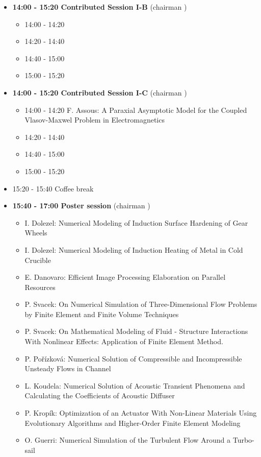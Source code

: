 \documentclass[10pt, A4]{article}%
\begin{document}
\begin{itemize}
\begin{itemize}
  \end{itemize}
  \item {\bf 14:00 - 15:20 Contributed Session I-B} (chairman ) 
  \begin{itemize}
    \item 14:00 - 14:20 
    \item 14:20 - 14:40 
    \item 14:40 - 15:00 
    \item 15:00 - 15:20 
  \end{itemize}
    \item {\bf 14:00 - 15:20 Contributed Session I-C} (chairman ) 
  \begin{itemize}
    \item 14:00 - 14:20 {F. Assous}: {A Paraxial Asymptotic Model for the Coupled Vlasov-Maxwel Problem in Electromagnetics}
    \item 14:20 - 14:40 
    \item 14:40 - 15:00 
    \item 15:00 - 15:20 
  \end{itemize}
  \item 15:20 - 15:40 Coffee break
  \item {\bf 15:40 - 17:00 Poster session} (chairman )
  \begin{itemize}
    \item {I. Dolezel}: {Numerical Modeling of Induction Surface Hardening of Gear Wheels}
    \item {I. Dolezel}: {Numerical Modeling of Induction Heating of Metal in Cold Crucible}
    \item {E. Danovaro}: {Efficient Image Processing Elaboration on Parallel Resources}
	\item {P. Svacek}: {On Numerical Simulation of Three-Dimensional Flow Problems by Finite Element and Finite Volume Techniques}
	\item {P. Svacek}: {On Mathematical Modeling of Fluid - Structure Interactions With Nonlinear Effects: Application of Finite Element Method.}
    \item {P. Pořízková}: {Numerical Solution of Compressible and Incompressible Unsteady Flows in Channel}
    \item {L. Koudela}: {Numerical Solution of Acoustic Transient Phenomena and Calculating the Coefficients of Acoustic Diffuser}
    \item {P. Kropík}: {Optimization of an Actuator With Non-Linear Materials Using Evolutionary Algorithms and Higher-Order Finite Element Modeling}
    \item {O. Guerri}: {Numerical Simulation of the Turbulent Flow Around a Turbo-sail}
  \end{itemize}
   
\end{itemize}
\end{document}
